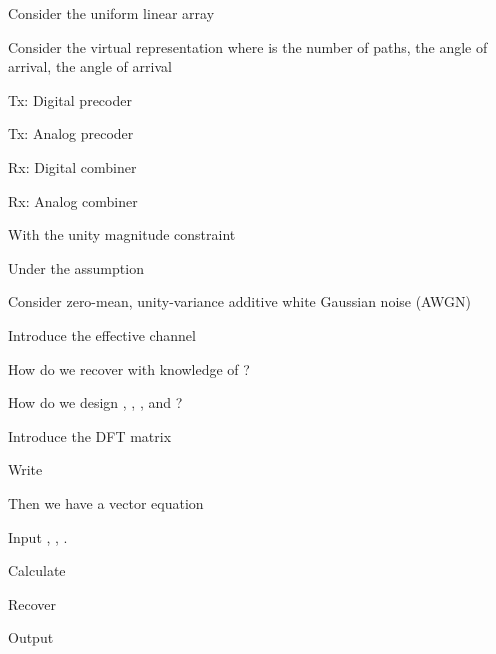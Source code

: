{
\I Consider the uniform linear array

\I Consider the virtual representation
where  is the number of paths,  the angle of arrival,  the angle of arrival
}
{
\I Tx: Digital precoder 

\I Tx: Analog precoder 

\I Rx: Digital combiner 

\I Rx: Analog combiner 

\I With the unity magnitude constraint

\I Under the assumption 
}
{
\I Consider zero-mean, unity-variance additive white Gaussian noise (AWGN) 

\I Introduce the effective channel

\I How do we recover  with knowledge of ?

\I How do we design , , , and ?
}
{
\I Introduce the DFT matrix 

\I Write

\I Then we have a vector equation
}
{
\I Input , , .

\I Calculate

\I Recover 

\I Output 
}

